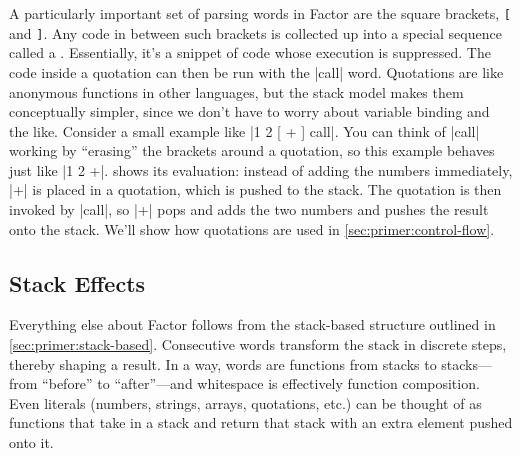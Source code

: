 


A particularly important set of parsing words in Factor are the square
brackets, \Verb|[| and \Verb|]|.  Any code in between such brackets is
collected up into a special sequence called a .  Essentially,
it's a snippet of code whose execution is suppressed.  The code inside a
quotation can then be run with the \factor|call| word.  Quotations are like
anonymous functions in other languages, but the stack model makes them
conceptually simpler, since we don't have to worry about variable binding and
the like.  Consider a small example like \factor|1 2 [ + ] call|.  You can
think of \factor|call| working by ``erasing'' the brackets around a quotation,
so this example behaves just like \factor|1 2 +|.   shows its
evaluation: instead of adding the numbers immediately, \factor|+| is placed in
a quotation, which is pushed to the stack.  The quotation is then invoked by
\factor|call|, so \factor|+| pops and adds the two numbers and pushes the
result onto the stack.  We'll show how quotations are used in
\cref{sec:primer:control-flow}.

\subsection{Stack Effects}\label{sec:primer:effects}

Everything else about Factor follows from the stack-based structure outlined in
\cref{sec:primer:stack-based}.  Consecutive words transform the stack in
discrete steps, thereby shaping a result.  In a way, words are functions from
stacks to stacks---from ``before'' to ``after''---and whitespace is effectively
function composition.  Even literals (numbers, strings, arrays, quotations,
etc.) can be thought of as functions that take in a stack and return that stack
with an extra element pushed onto it.

